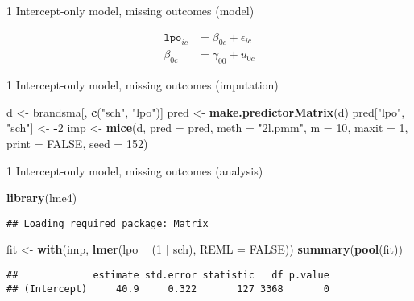 \documentclass[ignorenonframetext,aspectratio=43]{beamer}
\newenvironment{Shaded}{\begin{snugshade}}{\end{snugshade}}
\newcommand{\KeywordTok}[1]{\textcolor[rgb]{0.13,0.29,0.53}{\textbf{#1}}}
\newcommand{\DataTypeTok}[1]{\textcolor[rgb]{0.13,0.29,0.53}{#1}}
\newcommand{\DecValTok}[1]{\textcolor[rgb]{0.00,0.00,0.81}{#1}}
\newcommand{\StringTok}[1]{\textcolor[rgb]{0.31,0.60,0.02}{#1}}
\newcommand{\OtherTok}[1]{\textcolor[rgb]{0.56,0.35,0.01}{#1}}
\newcommand{\OperatorTok}[1]{\textcolor[rgb]{0.81,0.36,0.00}{\textbf{#1}}}
\newcommand{\NormalTok}[1]{#1}
\begin{document}
\begin{frame}{1 Intercept-only model, missing outcomes (model)}

\begin{align}
{{\texttt{lpo}}}_{ic} & = \beta_{0c} + \epsilon_{ic}\\
\beta_{0c}     & = \gamma_{00} + u_{0c}
\end{align}

\end{frame}

\begin{frame}[fragile]{1 Intercept-only model, missing outcomes
(imputation)}

\begin{Shaded}
\begin{Highlighting}[]
\NormalTok{d <-}\StringTok{ }\NormalTok{brandsma[, }\KeywordTok{c}\NormalTok{(}\StringTok{"sch"}\NormalTok{, }\StringTok{"lpo"}\NormalTok{)]}
\NormalTok{pred <-}\StringTok{ }\KeywordTok{make.predictorMatrix}\NormalTok{(d)}
\NormalTok{pred[}\StringTok{"lpo"}\NormalTok{, }\StringTok{"sch"}\NormalTok{] <-}\StringTok{ }\OperatorTok{-}\DecValTok{2}
\NormalTok{imp <-}\StringTok{ }\KeywordTok{mice}\NormalTok{(d, }\DataTypeTok{pred =}\NormalTok{ pred, }\DataTypeTok{meth =} \StringTok{"2l.pmm"}\NormalTok{, }\DataTypeTok{m =} \DecValTok{10}\NormalTok{, }\DataTypeTok{maxit =} \DecValTok{1}\NormalTok{,}
            \DataTypeTok{print =} \OtherTok{FALSE}\NormalTok{, }\DataTypeTok{seed =} \DecValTok{152}\NormalTok{)}
\end{Highlighting}
\end{Shaded}

\end{frame}

\begin{frame}[fragile]{1 Intercept-only model, missing outcomes
(analysis)}

\begin{Shaded}
\begin{Highlighting}[]
\KeywordTok{library}\NormalTok{(lme4)}
\end{Highlighting}
\end{Shaded}

\begin{verbatim}
## Loading required package: Matrix
\end{verbatim}

\begin{Shaded}
\begin{Highlighting}[]
\NormalTok{fit <-}\StringTok{ }\KeywordTok{with}\NormalTok{(imp, }\KeywordTok{lmer}\NormalTok{(lpo }\OperatorTok{~}\StringTok{ }\NormalTok{(}\DecValTok{1} \OperatorTok{|}\StringTok{ }\NormalTok{sch), }\DataTypeTok{REML =} \OtherTok{FALSE}\NormalTok{))}
\KeywordTok{summary}\NormalTok{(}\KeywordTok{pool}\NormalTok{(fit))}
\end{Highlighting}
\end{Shaded}

\begin{verbatim}
##             estimate std.error statistic   df p.value
## (Intercept)     40.9     0.322       127 3368       0
\end{verbatim}

\end{frame}
\end{document}
